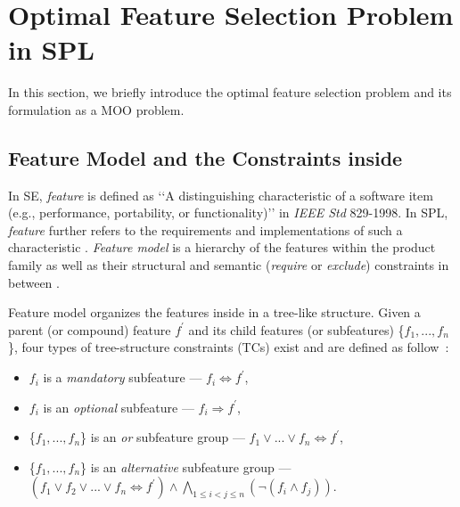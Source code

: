 \section{Optimal Feature Selection Problem in SPL}\label{sec:problem}

In this section, we briefly introduce the optimal feature selection problem  and its formulation as a MOO problem.



\subsection{Feature Model and the Constraints inside}
\label{featuremodel}
In SE, \emph{feature} is defined as \lq\lq{}A distinguishing characteristic of a software item (e.g., performance, portability, or functionality)\rq\rq{} in \emph{IEEE Std} 829-1998.
In SPL,  \emph{feature} further refers to the requirements and implementations of such a characteristic \cite{tr:foda}. \emph{Feature model} is a hierarchy of the features within the product family as well as their structural and semantic (\emph{require} or \emph{exclude}) constraints in between \cite{DBLP:books/daglib/0010411}. %

Feature model organizes the features inside in a tree-like structure. %
Given a parent (or compound) feature $f^\prime$ and its child features (or subfeatures) \{$f_1,...,f_n$\}, four types of tree-structure constraints (TCs) exist and are defined as follow~\cite{DBLP:conf/splc/Batory05}:

\begin{itemize}[itemindent=*]
\item  $f_i$ is a \emph{mandatory} subfeature --- $f_i \Leftrightarrow f^\prime$,
\item  $f_i$ is an \emph{optional} subfeature --- $f_i \Rightarrow f^\prime$,
\item  \{$f_1,...,f_n$\} is an \emph{or} subfeature group ---  $f_1 \vee ... \vee f_n\Leftrightarrow f^\prime$,
\item  \{$f_1,...,f_n$\} is an \emph{alternative} subfeature group --- $(f_1 \vee f_2 \vee ... \vee f_n\Leftrightarrow f^\prime)\wedge \bigwedge\limits_{1 \le i<j\le n}(\neg(f_i \wedge f_j))$.
\end{itemize}

